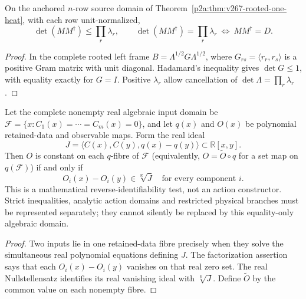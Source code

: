 \documentclass[12pt,a4paper]{article}
\begin{document}
\begin{proposition}
\label{p2a:prop:v267-normalized-determinant}
On the anchored $n$-row source domain of
Theorem~\ref{p2a:thm:v267-rooted-one-heat}, with each row unit-normalized,
\[
 \boxed{\det(MM^\dagger)\leq\prod_r\lambda_r,\qquad
 \det(MM^\dagger)=\prod_r\lambda_r
 \ \Longleftrightarrow\ MM^\dagger=D.}
\]
\end{proposition}
\begin{proof}
In the complete rooted left frame $B=\Lambda^{1/2}G\Lambda^{1/2}$,
where $G_{rs}=\langle r_r,r_s\rangle$ is a positive Gram matrix
with unit diagonal. Hadamard's inequality gives $\det G\leq1$, with
equality exactly for $G=I$.  Positive $\lambda_r$ allow cancellation
of $\det\Lambda=\prod_r\lambda_r$.
\end{proof}

\begin{proposition}
\label{p2a:prop:v267-real-radical-fibre}
Let the complete nonempty real algebraic input domain be
$\mathcal F=\{x:C_1(x)=\cdots=C_m(x)=0\}$, and let $q(x)$ and $O(x)$
be polynomial retained-data and observable maps.  Form the real ideal
\[
 J=\langle C(x),C(y),q(x)-q(y)\rangle\subset\mathbb R[x,y].
\]
Then $O$ is constant on each $q$-fibre of $\mathcal F$ (equivalently,
$O=\widetilde O\circ q$ for a set map on $q(\mathcal F)$) if and only if
\[
 \boxed{O_i(x)-O_i(y)\in\sqrt[\mathbb R]{J}
 \quad\text{for every component }i.}
\]
This is a mathematical reverse-identifiability test, not an action
constructor.  Strict inequalities, analytic action domains and restricted
physical branches must be represented separately; they cannot silently be
replaced by this equality-only algebraic domain.
\end{proposition}
\begin{proof}
Two inputs lie in one retained-data fibre precisely when they solve
the simultaneous real polynomial equations defining $J$.
The factorization assertion says that each $O_i(x)-O_i(y)$ vanishes
on that real zero set.  The real Nullstellensatz identifies its real
vanishing ideal with $\sqrt[\mathbb R]{J}$.  Define $\widetilde O$
by the common value on each nonempty fibre.
\end{proof}
\end{document}
